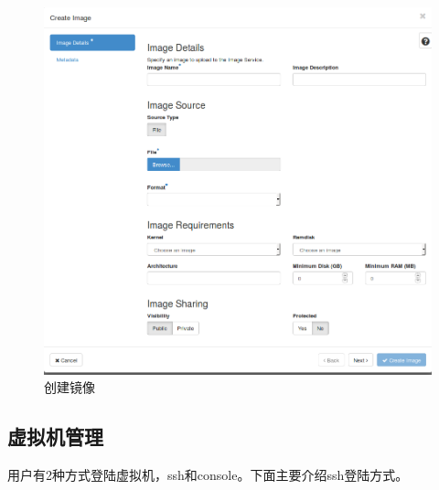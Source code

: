 \documentclass[12pt]{article}
\begin{document}
\begin{figure}[!htb]
\centering
\includegraphics[width=6in]{./figures/createImageI}
\caption{创建镜像}
\label{fig:createImageI}
\end{figure}
\subsection{虚拟机管理}
用户有2种方式登陆虚拟机，ssh和console。下面主要介绍ssh登陆方式。
\end{document}
